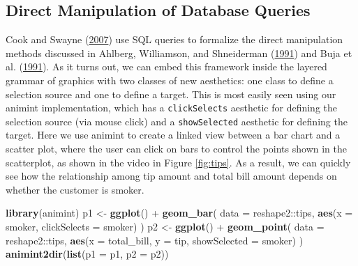 \documentclass[12pt,]{isuthesis}
\newenvironment{Shaded}{\begin{snugshade}}{\end{snugshade}}
\newcommand{\KeywordTok}[1]{\textcolor[rgb]{0.13,0.29,0.53}{\textbf{{#1}}}}
\newcommand{\DataTypeTok}[1]{\textcolor[rgb]{0.13,0.29,0.53}{{#1}}}
\newcommand{\StringTok}[1]{\textcolor[rgb]{0.31,0.60,0.02}{{#1}}}
\newcommand{\NormalTok}[1]{{#1}}
\begin{document}
\subsection{Direct Manipulation of Database Queries}
\label{sec:extension}

Cook and Swayne (\protect\hyperlink{ref-ggobi:2007}{2007}) use SQL
queries to formalize the direct manipulation methods discussed in
Ahlberg, Williamson, and Shneiderman
(\protect\hyperlink{ref-Ahlberg:1991}{1991}) and Buja et al.
(\protect\hyperlink{ref-Buja:1991vh}{1991}). As it turns out, we can
embed this framework inside the layered grammar of graphics with two
classes of new aesthetics: one class to define a selection source and
one to define a target. This is most easily seen using our animint
implementation, which has a \texttt{clickSelects} aesthetic for defining
the selection source (via mouse click) and a \texttt{showSelected}
aesthetic for defining the target. Here we use animint to create a
linked view between a bar chart and a scatter plot, where the user can
click on bars to control the points shown in the scatterplot, as shown
in the video in Figure \ref{fig:tips}. As a result, we can quickly see
how the relationship among tip amount and total bill amount depends on
whether the customer is smoker.

\begin{Shaded}
\begin{Highlighting}[]
\KeywordTok{library}\NormalTok{(animint)}
\NormalTok{p1 <-}\StringTok{ }\KeywordTok{ggplot}\NormalTok{() +}\StringTok{ }\KeywordTok{geom_bar}\NormalTok{(}
  \DataTypeTok{data =} \NormalTok{reshape2::tips, }
  \KeywordTok{aes}\NormalTok{(}\DataTypeTok{x =} \NormalTok{smoker, }\DataTypeTok{clickSelects =} \NormalTok{smoker)}
\NormalTok{)}
\NormalTok{p2 <-}\StringTok{ }\KeywordTok{ggplot}\NormalTok{() +}\StringTok{ }\KeywordTok{geom_point}\NormalTok{(}
  \DataTypeTok{data =} \NormalTok{reshape2::tips, }
  \KeywordTok{aes}\NormalTok{(}\DataTypeTok{x =} \NormalTok{total_bill, }\DataTypeTok{y =} \NormalTok{tip, }
      \DataTypeTok{showSelected =} \NormalTok{smoker)}
\NormalTok{)}
\KeywordTok{animint2dir}\NormalTok{(}\KeywordTok{list}\NormalTok{(}\DataTypeTok{p1 =} \NormalTok{p1, }\DataTypeTok{p2 =} \NormalTok{p2))}
\end{Highlighting}
\end{Shaded}
\end{document}
